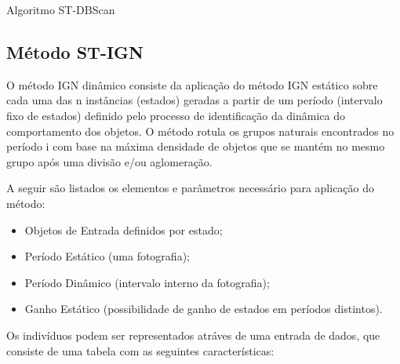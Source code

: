 \pagebreak
\begin{algorithm}[!ht]
	\SetSpacedAlgorithm
	\caption{\label{alg:algoritmo_stdbscan}Algoritmo ST-DBScan}
\end{algorithm}


\subsection{Método ST-IGN}
\label{stign}
O método IGN dinâmico consiste da aplicação do método IGN estático \cite{simposioNeg2003} sobre cada uma das n instâncias (estados) geradas a partir de um período (intervalo fixo de estados) definido pelo processo de identificação da dinâmica do comportamento dos objetos. O método rotula os grupos naturais encontrados no período i com base na máxima densidade de objetos que se mantém no mesmo grupo após uma divisão e/ou aglomeração.

A seguir são listados os elementos e parâmetros necessário para aplicação do método:
\begin{itemize}
\item Objetos de Entrada definidos por estado;
\item Período Estático (uma fotografia);
\item Período Dinâmico (intervalo interno da fotografia);
\item Ganho Estático (possibilidade de ganho de estados em períodos distintos).
\end{itemize}

Os indivíduos podem ser representados atráves de uma entrada de dados, que consiste de uma tabela com as seguintes características:

